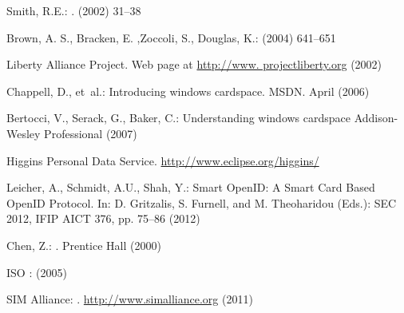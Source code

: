 \documentclass[runningheads,a4paper]{llncs}
\begin{document}


\providecommand{\noopsort}[1]{} \providecommand{\singleletter}[1]{#1}
\begin{thebibliography}{10}

%

Smith, R.E.:
.
 (2002)  31--38 

Brown, A. S., Bracken, E. ,Zoccoli, S., Douglas, K.:
 (2004)  641--651

{Liberty Alliance Project}.
\newblock Web page at \url{http://www. projectliberty.org} (2002)

Chappell, D.,  et~al.:
\newblock Introducing windows cardspace.
\newblock MSDN. April (2006)

Bertocci, V., Serack, G., Baker, C.:
\newblock Understanding windows cardspace
\newblock Addison-Wesley Professional (2007)

{Higgins Personal Data Service}.
\newblock \url{http://www.eclipse.org/higgins/}

Leicher, A., Schmidt, A.U., Shah, Y.:
Smart OpenID: A Smart Card Based OpenID Protocol. In:
D. Gritzalis, S. Furnell, and M. Theoharidou (Eds.): SEC 2012, IFIP AICT 376, pp. 75–86 (2012)

Chen, Z.:
.
\newblock Prentice Hall (2000)

{ISO }:
 ({2005})

{SIM Alliance}:
.
\newblock \url{http://www.simalliance.org} (2011)


\end{thebibliography}
\end{document}
